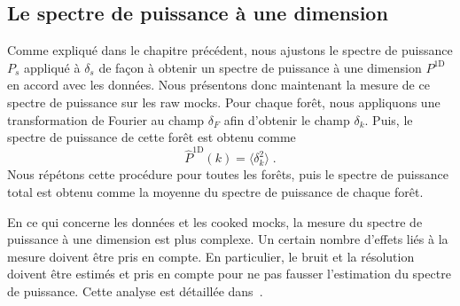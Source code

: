 \subsection{Le spectre de puissance à une dimension}
\label{subsec:p1d_estimateur}
Comme expliqué dans le chapitre précédent, nous ajustons le spectre de puissance $P_{s}$ appliqué à $\delta_s$ de façon à obtenir un spectre de puissance à une dimension $P^{\mathrm{1D}}$ en accord avec les données. Nous présentons donc maintenant la mesure de ce spectre de puissance sur les raw mocks. Pour chaque forêt, nous appliquons une transformation de Fourier au champ $\delta_F$ afin d'obtenir le champ $\delta_k$. Puis, le spectre de puissance de cette forêt est obtenu comme
\begin{equation}
  \label{eq:estimateur_p1d}
\hat  P^{\mathrm{1D}}(k) = \langle \delta_k^2 \rangle \; .
\end{equation}
Nous répétons cette procédure pour toutes les forêts, puis le spectre de puissance total est obtenu comme la moyenne du spectre de puissance de chaque forêt.

En ce qui concerne les données et les cooked mocks, la mesure du spectre de puissance à une dimension est plus complexe. Un certain nombre d'effets liés à la mesure doivent être pris en compte. En particulier, le bruit et la résolution doivent être estimés et pris en compte pour ne pas fausser l'estimation du spectre de puissance. Cette analyse est détaillée dans~\textcite{Chabanier2018}.

